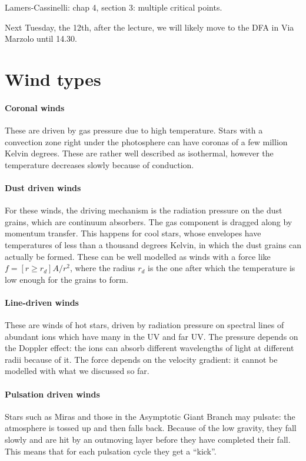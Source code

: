 \documentclass[main.tex]{subfiles}
\begin{document}
Lamers-Cassinelli: chap 4, section 3: multiple critical points.

Next Tuesday, the 12th, after the lecture, we will likely move to the DFA in Via Marzolo until 14.30.

\section{Wind types}

\paragraph{Coronal winds}
These are driven by gas pressure due to high temperature.
Stars with a convection zone right under the photosphere can have coronas of a few million Kelvin degrees. 
These are rather well described as isothermal, however the temperature decreases slowly because of conduction.

\paragraph{Dust driven winds}
For these winds, the driving mechanism is the radiation pressure on the dust grains, which are continuum absorbers. The gas component is dragged along by momentum transfer. 
This happens for cool stars, whose envelopes have temperatures of less than a thousand degrees Kelvin, in which the dust grains can actually be formed. 
These can be well modelled as winds with a force like \(f = [r \geq r_d] A / r^2\), where the radius \(r_d\) is the one after which the temperature is low enough for the grains to form.

\paragraph{Line-driven winds}
These are winds of hot stars, driven by radiation pressure on spectral lines of abundant ions which have many in the UV and far UV.
The pressure depends on the Doppler effect: the ions can absorb different wavelengths of light at different radii because of it.
The force depends on the velocity gradient: it cannot be modelled with what we discussed so far.

\paragraph{Pulsation driven winds}
Stars such as Miras and those in the Asymptotic Giant Branch may pulsate: the atmosphere is tossed up and then falls back. Because of the low gravity, they fall slowly and are hit by an outmoving layer before they have completed their fall. 
This means that for each pulsation cycle they get a ``kick''.  
\end{document}
